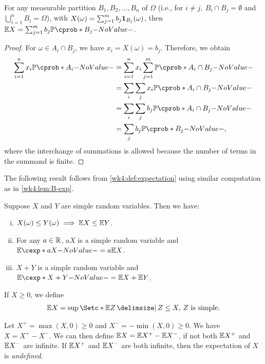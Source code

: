 \documentclass[12pt]{article}
\begin{document}
\begin{Lemma}\label{wk4:lem:B-exp}
For any measurable partition $B_1,B_2,\ldots,B_n$ of $\Omega$ (i.e., for $i \neq j,\ B_{i}\cap B_{j}= \emptyset$ and $\bigcup_{i=1}^n{B_{i}} = \Omega$), with $X(\omega)=\sum_{j=1}^m b_j {\bf 1}_{B_j}(\omega)$, then $\E X= \sum_{j=1}^m{b_j \P({B_j})}$.
\end{Lemma}
\begin{proof}
For $\omega \in A_i\cap B_j$, we have $x_i=X(\omega)= b_j$. Therefore, we obtain
\begin{align*}
\sum_{i=1}^n{x_i \P(A_i)}
& = \sum_{i=1}^n{x_i}\sum_{j=1}^m{\P(A_i\cap B_j)}\\
& = \sum_{i} \sum_{j} {x_i\P(A_i\cap B_j)}\\
& = \sum_{i} \sum_{j} {b_j\P(A_i\cap B_j)}\\
& =\sum_{j} {b_j\P(B_j)}, 
\end{align*}
where the interchange of summations is allowed because the number of terms in the summand is finite.
\end{proof}


The following result follows from \cref{wk4:def:expectation} using similar computation as in \cref{wk4:lem:B-exp}.
\begin{Lemma}\label{wk4:lem:simpleprop}
Suppose $X$ and $Y$ are simple random variables. Then we have:
\begin{enumerate}[(i)]
\item $X(\omega)\leq Y(\omega) \implies \E X \leq \E Y$.
\item For any $a\in\mathbb{R}$, $aX$ is a simple random variable and $\E[a X]= a \E X$.
\item $X+Y$ is a simple random variable and $\E[X + Y]=\E X + \E Y$.
\end{enumerate}
\end{Lemma}

\begin{Definition}\label{wk4:def:expectation_nz}
If $X \geq 0$, we define
\begin{align*}
\E X = \sup\set*{\E Z \given Z\leq X,\, Z \text{ is simple}}.
\end{align*}
\end{Definition}

Let $X^+=\max(X,0)\geq 0$ and $X^-=-\min(X,0)\geq 0$. We have $X=X^+ - X^-$. We can then define $\E X= \E X^+- \E X^-$, if not both $\E X^+$ and $\E X^-$ are infinite. If $\E X^+$ and $\E X^-$ are both infinite, then the expectation of $X$ is \emph{undefined}.
\end{document}
